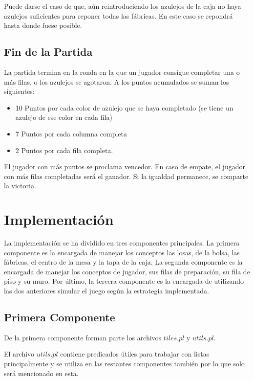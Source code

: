 \documentclass[11pt]{article}
\begin{document}
Puede darse el caso de que, aún reintroduciendo los azulejos de la caja no haya azulejos suficientes para reponer todas las fábricas. En este caso se repondrá hasta donde fuese posible.

\subsection{Fin de la Partida}

La partida termina en la ronda en la que un jugador consigue completar una o más filas, o los azulejos se agotaron. A los puntos acumulados se suman los siguientes:

\begin{itemize}
	\item 10 Puntos por cada color de azulejo que se haya completado (se tiene un azulejo de ese color en cada fila)
	\item 7 Puntos por cada columna completa
	\item 2 Puntos por cada fila completa.
\end{itemize}

El jugador con más puntos se proclama vencedor. En caso de empate, el jugador con más filas completadas será el ganador. Si la igualdad permanece, se comparte la victoria.

\section{Implementación}

La implementación se ha dividido en tres componentes principales. La primera componente es la encargada de manejar los conceptos las losas, de la bolsa, las fábricas, el centro de la mesa y la tapa de la caja. La segunda componente es la encargada de manejar los conceptos de jugador, sus filas de preparación, su fila de piso y su muro. Por último, la tercera componente es la encargada de utilizando las dos anteriores simular el juego según la estrategia implementada.

\subsection{Primera Componente}

De la primera componente forman parte los archivos $tiles.pl$ y $utils.pl$.

El archivo $utils.pl$ contiene predicados útiles para trabajar con listas principalmente y se utiliza en las restantes componentes también por lo que solo será mencionado en esta.
\end{document}
